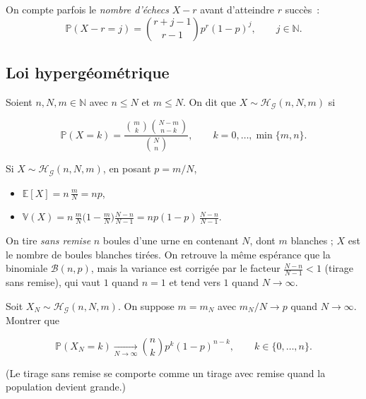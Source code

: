 \begin{remarque}
On compte parfois le \emph{nombre d'échecs} $X-r$ avant d'atteindre $r$ succès~:
\[
  \mathbb{P}(X-r=j)=\binom{r+j-1}{r-1}p^r(1-p)^j,\qquad j\in\mathbb{N}.
\]
\end{remarque}

\subsection{Loi hypergéométrique}

\medskip

\begin{mdframed}
\begin{definition}
Soient $n,N,m\in\mathbb{N}$ avec $n\le N$ et $m\le N$. On dit que
$X\sim\mathcal{H_G}(n,N,m)$ si

$$
  \mathbb{P}(X=k)=\frac{\binom mk\binom{N-m}{n-k}}{\binom Nn},
  \qquad k=0,\dots,\min\{m,n\}.
$$
\end{definition}
\end{mdframed}

\medskip

\begin{mdframed}
\begin{proposition}
Si $X\sim\mathcal{H_G}(n,N,m)$, en posant $p=m/N$,

\begin{itemize}
\item $\mathbb{E}[X]=n\,\frac mN=np$,
\item $\mathbb{V}(X)=n\,\frac mN\Big(1-\frac mN\Big)\frac{N-n}{N-1}
         =np(1-p)\,\frac{N-n}{N-1}$.
\end{itemize}
\end{proposition}
\end{mdframed}

\begin{remarque}
On tire \emph{sans remise} $n$ boules d'une urne en contenant $N$, dont $m$ blanches ; $X$ est le nombre de boules blanches tirées. On retrouve la même espérance que la binomiale $\mathcal{B}(n,p)$, mais la variance est corrigée par le facteur $\frac{N-n}{N-1}<1$ (tirage sans remise), qui vaut $1$ quand $n=1$ et tend vers $1$ quand $N\to\infty$.
\end{remarque}

\begin{exercice}
Soit $X_N\sim\mathcal{H_G}(n,N,m)$. On suppose $m=m_N$ avec $m_N/N\to p$ quand $N\to\infty$. Montrer que

$$
  \mathbb{P}(X_N=k)\xrightarrow[N\to\infty]{}\binom nk p^k(1-p)^{n-k},
  \qquad k\in\{0,\dots,n\}.
$$

(Le tirage sans remise se comporte comme un tirage avec remise quand la population devient grande.)
\end{exercice}

